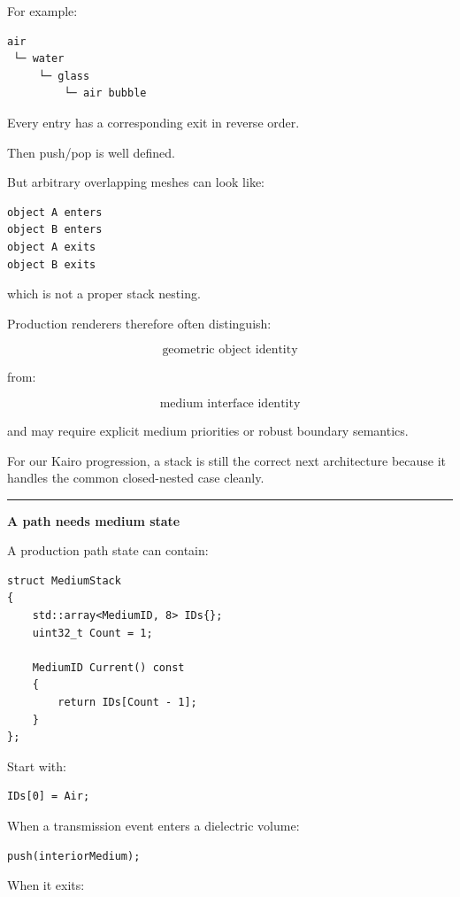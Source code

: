 For example:

\begin{verbatim}
air
 └─ water
     └─ glass
         └─ air bubble
\end{verbatim}

Every entry has a corresponding exit in reverse order.

Then push/pop is well defined.

But arbitrary overlapping meshes can look like:

\begin{verbatim}
object A enters
object B enters
object A exits
object B exits
\end{verbatim}

which is not a proper stack nesting.

Production renderers therefore often distinguish:

\[
\text{geometric object identity}
\]

from:

\[
\text{medium interface identity}
\]

and may require explicit medium priorities or robust boundary semantics.

For our Kairo progression, a stack is still the correct next architecture because it handles the common closed-nested case cleanly.

\begin{center}\rule{0.5\linewidth}{0.5pt}\end{center}

\textbf{A path needs medium state}

A production path state can contain:

\begin{verbatim}
struct MediumStack
{
    std::array<MediumID, 8> IDs{};
    uint32_t Count = 1;

    MediumID Current() const
    {
        return IDs[Count - 1];
    }
};
\end{verbatim}

Start with:

\begin{verbatim}
IDs[0] = Air;
\end{verbatim}

When a transmission event enters a dielectric volume:

\begin{verbatim}
push(interiorMedium);
\end{verbatim}

When it exits:

